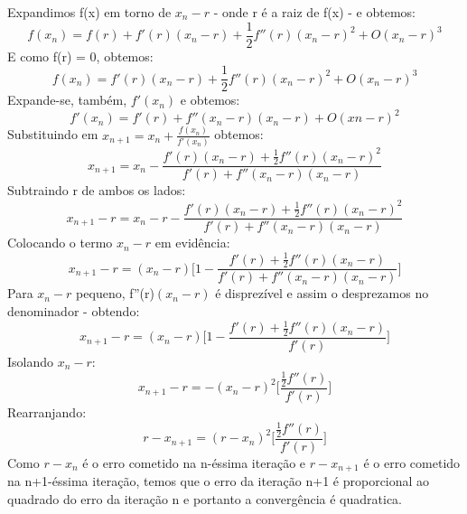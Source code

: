 \documentclass[12pt, a4paper]{article} %
\begin{document}
        Expandimos f(x) em torno de $x_{n} - r$ - onde r \'e a raiz de f(x) - e obtemos:
        \begin{equation}
            f(x_{n}) = f(r) + f'(r)(x_{n} - r) + \frac{1}{2} f''(r)(x_{n}  - r)^2 + O(x_{n} - r)^3
        \end{equation}
        E como f(r) = 0, obtemos:
        \begin{equation}
            f(x_{n}) = f'(r)(x_{n} - r) + \frac{1}{2} f''(r)(x_{n}  - r)^2 + O(x_{n} - r)^3
        \end{equation}
        Expande-se, também, $f'(x_{n})$ e obtemos:
        \begin{equation}
            f'(x_{n}) = f'(r) + f''(x_{n} - r)(x_{n} - r) + O(x{n} - r)^2
        \end{equation}
        Substituindo em $x_{n+1} = x_{n} + \frac{f(x_{n})}{f'(x_{n})}$ obtemos:
        \begin{equation}
            x_{n+1} = x_{n} - \frac{f'(r)(x_{n} - r) + \frac{1}{2} f''(r)(x_{n}  - r)^2}{f'(r) + f''(x_{n} - r)(x_{n} - r)}
        \end{equation}
        Subtraindo r de ambos os lados:
        \begin{equation}
            x_{n+1} - r = x_{n} - r - \frac{f'(r)(x_{n} - r) + \frac{1}{2} f''(r)(x_{n}  - r)^2}{f'(r) + f''(x_{n} - r)(x_{n} - r)}
        \end{equation}
        Colocando o termo $x_{n} - r$ em evid\^encia:
        \begin{equation}
            x_{n+1} - r = (x_{n} - r)\bigg[1 - \frac{f'(r) + \frac{1}{2} f''(r)(x_{n}  - r)}{f'(r) + f''(x_{n} - r)(x_{n} - r)}\bigg]
        \end{equation}
        Para $x_{n} - r$ pequeno, f''(r)$(x_{n} - r)$ \'e disprez\'ivel e assim o desprezamos no denominador - obtendo:
        \begin{equation}
            x_{n+1} - r = (x_{n} - r)\bigg[1 - \frac{f'(r) + \frac{1}{2} f''(r)(x_{n}  - r)}{f'(r)}\bigg]
        \end{equation}
        Isolando $x_{n} - r$:
        \begin{equation}
            x_{n+1} - r = -(x_{n} - r)^2\bigg[\frac{\frac{1}{2} f''(r)}{f'(r)}\bigg]
        \end{equation}
        Rearranjando:
        \begin{equation}
            r - x_{n+1} = (r - x_{n})^2\bigg[\frac{\frac{1}{2} f''(r)}{f'(r)}\bigg]
        \end{equation}
        Como $r - x_{n}$ \'e o erro cometido na n-\'essima itera\c{c}\~ao e $r - x_{n+1}$ \'e o erro cometido na n+1-\'essima itera\c{c}\~ao, temos que o erro da itera\c{c}\~ao n+1 \'e proporcional ao quadrado do erro da itera\c{c}\~ao n e portanto a converg\^encia \'e quadratica.
\end{document}
